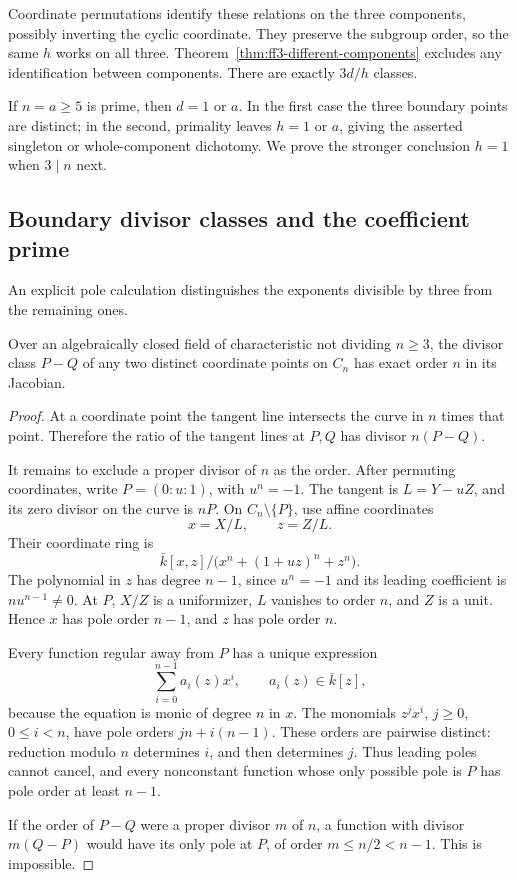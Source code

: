Coordinate permutations identify these relations on the three
components, possibly inverting the cyclic coordinate. They preserve
the subgroup order, so the same \(h\) works on all three.
Theorem~\ref{thm:ff3-different-components} excludes any identification
between components. There are exactly \(3d/h\) classes.

If \(n=a\ge5\) is prime, then \(d=1\) or \(a\).
In the first case the three boundary points are distinct; in the
second, primality leaves \(h=1\) or \(a\), giving the asserted
singleton or whole-component dichotomy. We prove the stronger
conclusion \(h=1\) when \(3\mid n\) next.

\subsection{Boundary divisor classes and the coefficient prime}
\label{subsec:ff3-abelian}

An explicit pole calculation distinguishes the exponents divisible
by three from the remaining ones.

\begin{lemma}
\label{lem:ff3-exact-cusp-order}
Over an algebraically closed field of characteristic not dividing
\(n\ge3\), the divisor class \(P-Q\) of any two distinct coordinate
points on \(C_n\) has exact order \(n\) in its Jacobian.
\end{lemma}
\begin{proof}
At a coordinate point the tangent line intersects the curve in
\(n\) times that point. Therefore the ratio of the tangent lines at
\(P,Q\) has divisor \(n(P-Q)\).

It remains to exclude a proper divisor of \(n\) as the order.
After permuting coordinates, write \(P=(0:u:1)\), with \(u^n=-1\).
The tangent is \(L=Y-uZ\), and its zero divisor on the curve is \(nP\).
On \(C_n\setminus\{P\}\), use affine coordinates
\[
 x=X/L,\qquad z=Z/L.
\]
Their coordinate ring is
\[
 \bar k[x,z]\big/\bigl(x^n+(1+uz)^n+z^n\bigr).
\]
The polynomial in \(z\) has degree \(n-1\), since \(u^n=-1\)
and its leading coefficient is \(n u^{n-1}\ne0\).
At \(P\), \(X/Z\) is a uniformizer, \(L\) vanishes to order \(n\),
and \(Z\) is a unit. Hence \(x\) has pole order \(n-1\), and \(z\)
has pole order \(n\).

Every function regular away from \(P\) has a unique expression
\[
 \sum_{i=0}^{n-1} a_i(z)x^i,\qquad a_i(z)\in\bar k[z],
\]
because the equation is monic of degree \(n\) in \(x\).
The monomials \(z^j x^i\), \(j\ge0\), \(0\le i<n\), have pole orders
\(jn+i(n-1)\). These orders are pairwise distinct: reduction modulo
\(n\) determines \(i\), and then determines \(j\).
Thus leading poles cannot cancel, and every nonconstant function
whose only possible pole is \(P\) has pole order at least \(n-1\).

If the order of \(P-Q\) were a proper divisor \(m\) of \(n\),
a function with divisor \(m(Q-P)\) would have its only pole at
\(P\), of order \(m\le n/2<n-1\). This is impossible.
\end{proof}

